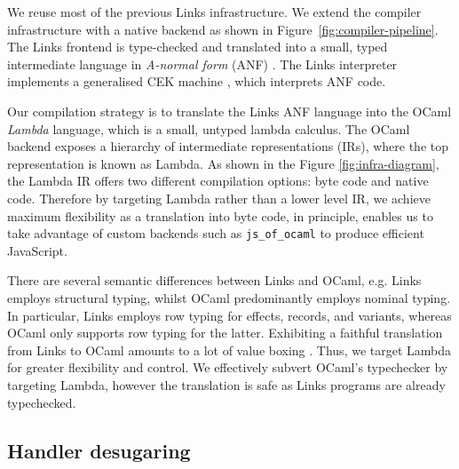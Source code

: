 \documentclass[12pt,mscres,cdtppar,twoside,openright,logo,rightchapter,normalheadings]{infthesis}
\theoremstyle{definition}
\begin{document}
We reuse most of the previous Links infrastructure. We extend the
compiler infrastructure with a native backend as shown in
Figure~\ref{fig:compiler-pipeline}. The Links frontend is type-checked
and translated into a small, typed intermediate language in
\emph{A-normal form} (ANF) \citep{Flanagan1993}. The Links interpreter
implements a generalised CEK machine \citep{Hillerstrom2016a}, which
interprets ANF code.

%

Our compilation strategy is to translate the Links ANF language into the OCaml
\emph{Lambda} language, which is a small, untyped lambda calculus. The OCaml
backend exposes a hierarchy of intermediate representations (IRs), where the
top representation is known as Lambda. As shown in the Figure
\ref{fig:infra-diagram}, the Lambda IR offers two different compilation
options: byte code and native code. Therefore by targeting Lambda rather than
a lower level IR, we achieve maximum flexibility as a translation into byte
code, in principle, enables us to take advantage of custom backends such as
\texttt{js\_of\_ocaml} to produce efficient JavaScript.

%

There are several semantic differences between Links and OCaml,
e.g. Links employs structural typing, whilst OCaml predominantly
employs nominal typing.  In particular, Links employs row typing for
effects, records, and variants, whereas OCaml only supports row typing
for the latter. Exhibiting a faithful translation from Links to OCaml
amounts to a lot of value boxing \citep{Hol09}. Thus, we target Lambda
for greater flexibility and control.  We effectively subvert OCaml's
typechecker by targeting Lambda, however the translation is safe as
Links programs are already typechecked.

\subsection{Handler desugaring}

\newcommand{\desugar}{\mathcal{D}}
\newcommand{\vecc}{\overline}
\renewcommand{\vec}{\overline}
\end{document}
